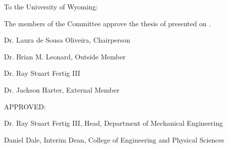 \thispagestyle{empty}

\setlength{\parindent}{0pt}

\begin{raggedright}
    To the University of Wyoming:
    
    \qquad The members of the Committee approve the thesis of \authorname{} presented on .
\end{raggedright}

\vspace{0.75in}

\begin{flushright}
    Dr. Laura de Sousa Oliveira, Chairperson
    \vspace{\baselineskip}
    
    Dr. Brian M. Leonard, Outside Member
    \vspace{\baselineskip}
    
    Dr. Ray Stuart Fertig III
    \vspace{\baselineskip}
    
    Dr. Jackson Harter, External Member
\end{flushright}

\vspace*{\fill}

\begin{raggedright}
    APPROVED:
    \vspace{\baselineskip}
    
    Dr. Ray Stuart Fertig III, Head, Department of Mechanical Engineering
    \vspace{\baselineskip}
    
    Daniel Dale, Interim Dean, College of Engineering and Physical Sciences
    \vspace{\baselineskip}
\end{raggedright}

\clearpage